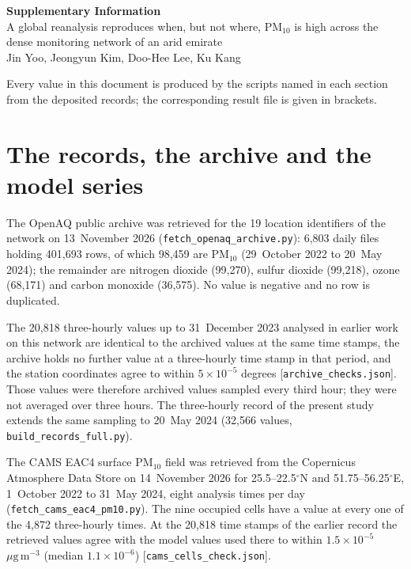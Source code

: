 \documentclass[11pt]{article}
\newcommand*{\ugm}{\ensuremath{\mu\mathrm{g\,m^{-3}}}}
\newcommand*{\pmten}{\ensuremath{\mathrm{PM_{10}}}}
\begin{document}
\begin{center}
{\large\bfseries Supplementary Information}\\[6pt]
{\large A global reanalysis reproduces when, but not where, PM$_{10}$ is high across the dense
monitoring network of an arid emirate}\\[8pt]
Jin Yoo, Jeongyun Kim, Doo-Hee Lee, Ku Kang
\end{center}

\noindent Every value in this document is produced by the scripts named in each section from the
deposited records; the corresponding result file is given in brackets.

\section{The records, the archive and the model series}

The OpenAQ public archive was retrieved for the 19 location identifiers of the network on
13~November 2026 (\texttt{fetch\_openaq\_archive.py}): 6,803 daily files holding 401,693 rows,
of which 98,459 are \pmten{} (29~October 2022 to 20~May 2024); the remainder are nitrogen dioxide
(99,270), sulfur dioxide (99,218), ozone (68,171) and carbon monoxide (36,575). No value is
negative and no row is duplicated.

The 20,818 three-hourly values up to 31~December 2023 analysed in earlier work on this network
are identical to the archived values at the same time stamps, the archive holds no further value
at a three-hourly time stamp in that period, and the station coordinates agree to within
$5\times10^{-5}$ degrees [\texttt{archive\_checks.json}]. Those values were therefore archived
values sampled every third hour; they were not averaged over three hours. The three-hourly record
of the present study extends the same sampling to 20~May 2024 (32,566 values,
\texttt{build\_records\_full.py}).

The CAMS EAC4 surface \pmten{} field was retrieved from the Copernicus Atmosphere Data Store on
14~November 2026 for 25.5--22.5$^{\circ}$N and 51.75--56.25$^{\circ}$E, 1~October 2022 to
31~May 2024, eight analysis times per day (\texttt{fetch\_cams\_eac4\_pm10.py}). The nine
occupied cells have a value at every one of the 4,872 three-hourly times. At the 20,818 time
stamps of the earlier record the retrieved values agree with the model values used there to
within $1.5\times10^{-5}$~\ugm{} (median $1.1\times10^{-6}$) [\texttt{cams\_cells\_check.json}].
\end{document}
